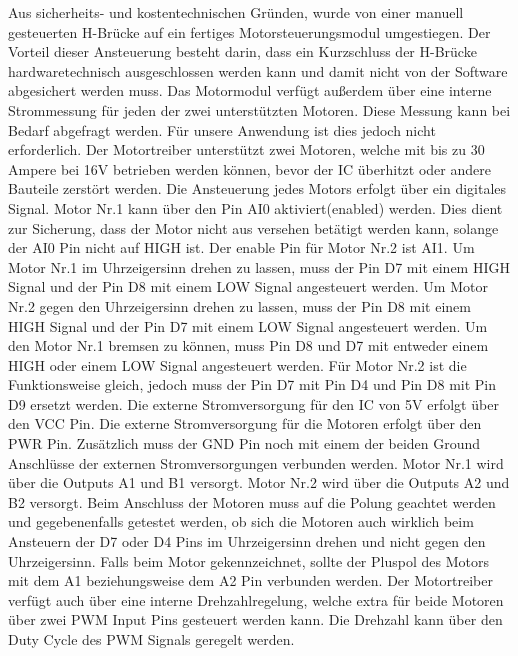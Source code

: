 Aus sicherheits- und kostentechnischen Gründen, wurde von einer manuell gesteuerten H-Brücke auf ein fertiges Motorsteuerungsmodul umgestiegen. Der Vorteil dieser Ansteuerung besteht darin, dass ein Kurzschluss der H-Brücke hardwaretechnisch ausgeschlossen werden kann und damit nicht von der Software abgesichert werden muss. Das Motormodul verfügt außerdem über eine interne Strommessung für jeden der zwei unterstützten Motoren. Diese Messung kann bei Bedarf abgefragt werden. Für unsere Anwendung ist dies jedoch nicht erforderlich. Der Motortreiber unterstützt zwei Motoren, welche mit bis zu 30 Ampere bei 16V betrieben werden können, bevor der IC überhitzt oder andere Bauteile zerstört werden. Die Ansteuerung jedes Motors erfolgt über ein digitales Signal. Motor Nr.1 kann über den Pin AI0 aktiviert(enabled) werden. Dies dient zur Sicherung, dass der Motor nicht aus versehen betätigt werden kann, solange der AI0 Pin nicht auf HIGH ist. Der enable Pin für Motor Nr.2 ist AI1. Um Motor Nr.1 im Uhrzeigersinn drehen zu lassen, muss der Pin D7 mit einem HIGH Signal und der Pin D8 mit einem LOW Signal angesteuert werden. Um Motor Nr.2 gegen den Uhrzeigersinn drehen zu lassen, muss der Pin D8 mit einem HIGH Signal und der Pin D7 mit einem LOW Signal angesteuert werden. Um den Motor Nr.1 bremsen zu können, muss Pin D8 und D7 mit entweder einem HIGH oder einem LOW Signal angesteuert werden. Für Motor Nr.2 ist die Funktionsweise gleich, jedoch muss der Pin D7 mit Pin D4 und Pin D8 mit Pin D9 ersetzt werden. Die externe Stromversorgung für den IC von 5V erfolgt über den VCC Pin. Die externe Stromversorgung für die Motoren erfolgt über den PWR Pin. Zusätzlich muss der GND Pin noch mit einem der beiden Ground Anschlüsse der externen Stromversorgungen verbunden werden. Motor Nr.1 wird über die Outputs A1 und B1 versorgt. Motor Nr.2 wird über die Outputs A2 und B2 versorgt. Beim Anschluss der Motoren muss auf die Polung geachtet werden und gegebenenfalls getestet werden, ob sich die Motoren auch wirklich beim Ansteuern der D7 oder D4 Pins im Uhrzeigersinn drehen und nicht gegen den Uhrzeigersinn. Falls beim Motor gekennzeichnet, sollte der Pluspol des Motors mit dem A1 beziehungsweise dem A2 Pin verbunden werden. Der Motortreiber verfügt auch über eine interne Drehzahlregelung, welche extra für beide Motoren über zwei PWM Input Pins gesteuert werden kann. Die Drehzahl kann über den Duty Cycle des PWM Signals geregelt werden.
